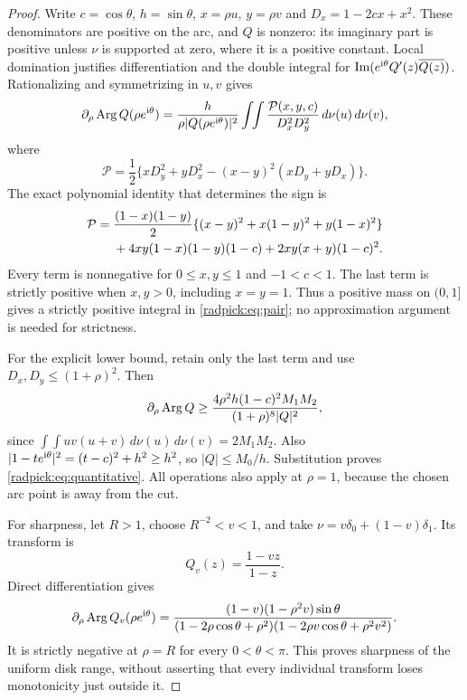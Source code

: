 \begin{proof}
Write $c=\cos\theta$, $h=\sin\theta$, $x=\rho u$, $y=\rho v$ and
$D_x=1-2cx+x^2$. These denominators are positive on the arc, and $Q$
is nonzero: its imaginary part is positive unless $\nu$ is supported at
zero, where it is a positive constant. Local domination justifies
differentiation and the double integral for
$\operatorname{Im}(e^{\mathrm{i}\theta}Q'(z)\overline{Q(z)})$.
Rationalizing and symmetrizing in $u,v$ gives
\begin{equation}\label{radpick:eq:pair}
 \partial_\rho\operatorname{Arg} Q(\rho e^{\mathrm{i}\theta})
 =\frac{h}{\rho|Q(\rho e^{\mathrm{i}\theta})|^2}
   \int\!\!\int\frac{\mathcal P(x,y,c)}{D_x^2D_y^2}
                           \,d\nu(u)\,d\nu(v),
\end{equation}
where
\[
 \mathcal P=\frac12\{xD_y^2+yD_x^2
                    -(x-y)^2(xD_y+yD_x)\}.
\]
The exact polynomial identity that determines the sign is
\begin{align}\label{radpick:eq:positive-decomposition}
 \mathcal P={}&\frac{(1-x)(1-y)}2
   \{(x-y)^2+x(1-y)^2+y(1-x)^2\}\notag\\
 &+4xy(1-x)(1-y)(1-c)
       +2xy(x+y)(1-c)^2.
\end{align}
Every term is nonnegative for $0\le x,y\le1$ and $-1<c<1$.
The last term is strictly positive when $x,y>0$, including $x=y=1$.
Thus a positive mass on $(0,1]$ gives a strictly positive integral in
\eqref{radpick:eq:pair}; no approximation argument is needed for strictness.

For the explicit lower bound, retain only the last term and use
$D_x,D_y\le(1+\rho)^2$. Then
\[
 \partial_\rho\operatorname{Arg} Q
 \ge\frac{4\rho^2h(1-c)^2M_1M_2}
              {(1+\rho)^8|Q|^2},
\]
since $\int\!\!\int uv(u+v)\,d\nu(u)\,d\nu(v)=2M_1M_2$.
Also $|1-te^{\mathrm{i}\theta}|^2=(t-c)^2+h^2\ge h^2$, so
$|Q|\le M_0/h$. Substitution proves
\eqref{radpick:eq:quantitative}. All operations also apply at $\rho=1$,
because the chosen arc point is away from the cut.

For sharpness, let $R>1$, choose $R^{-2}<v<1$, and take
$\nu=v\delta_0+(1-v)\delta_1$. Its transform is
\[
 Q_v(z)=\frac{1-vz}{1-z}.
\]
Direct differentiation gives
\begin{equation}\label{radpick:eq:outside-counterexample}
 \partial_\rho\operatorname{Arg} Q_v(\rho e^{\mathrm{i}\theta})
 =\frac{(1-v)(1-\rho^2v)\sin\theta}
 {(1-2\rho\cos\theta+\rho^2)
  (1-2\rho v\cos\theta+\rho^2v^2)}.
\end{equation}
It is strictly negative at $\rho=R$ for every $0<\theta<\pi$.
This proves sharpness of the uniform disk range, without asserting
that every individual transform loses monotonicity just outside it.
\end{proof}

